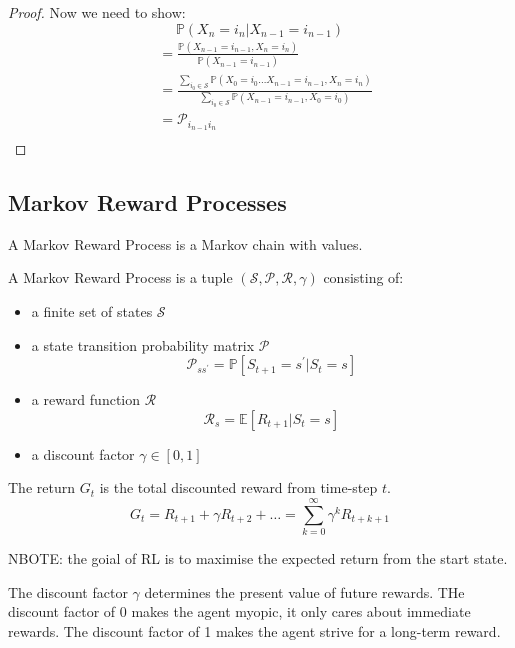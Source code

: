 \begin{proof}
    Now we need to show:
    \[
        \mathbb{P}(X_{n} = i_{n} | X_{n-1} = i_{n-1})
    \]
    \[
        \begin{aligned}
            & = \frac{\mathbb{P}(X_{n-1} = i_{n-1}, X_{n} = i_{n})}{\mathbb{P}(X_{n-1} = i_{n-1})} \\
            & = \frac{\sum_{i_0 \in \mathcal{S} } \mathbb{P}(X_0 = i_0 \dots  X_{n-1} = i_{n-1}, X_{n} = i_{n})}
            {\sum_{i_0 \in \mathcal{S} } \mathbb{P}(X_{n-1} = i_{n-1}, X_{0} = i_{0})} \\
            & = \mathcal{P} _{i_{n-1} i_n} \\
        \end{aligned}
    \]

\end{proof}

\subsection{Markov Reward Processes}
A Markov Reward Process is a Markov chain with values.
\begin{definition}
    A Markov Reward Process is a tuple \((\mathcal{S}, \mathcal{P} , \mathcal{R} , \gamma)\)
    consisting of:
    \begin{itemize}
        \item a finite set of states \(\mathcal{S} \)
        \item a state transition probability matrix \(\mathcal{P} \)
        \[
            \mathcal{P} _{ss^{\prime}} = \mathbb{P}  [S_{t+1} = s^{\prime} | S_{t} = s]  
        \]
        \item a reward function \(\mathcal{R} \)
        \[
            \mathcal{R} _{s} = \mathbb{E}  [R_{t+1} | S_{t} = s]  
        \]
        \item a discount factor \(\gamma \in [0, 1]\)
    \end{itemize}
\end{definition}
\begin{definition}[Return]
    The return \(G_{t}\) is the total discounted reward from time-step \(t\).
    \[
        G_{t} = R_{t+1} + \gamma R_{t+2} + \dots = \sum_{k=0}^{\infty} \gamma^{k} R_{t+k+1}  
    \]
\end{definition}
NBOTE: the goial of RL is to maximise the expected return from the start state. 

The discount factor \(\gamma \) determines the present value of future rewards. THe discount
factor of 0 makes the agent myopic, it only cares about immediate rewards. The discount 
factor of 1 makes the agent strive for a long-term reward.

